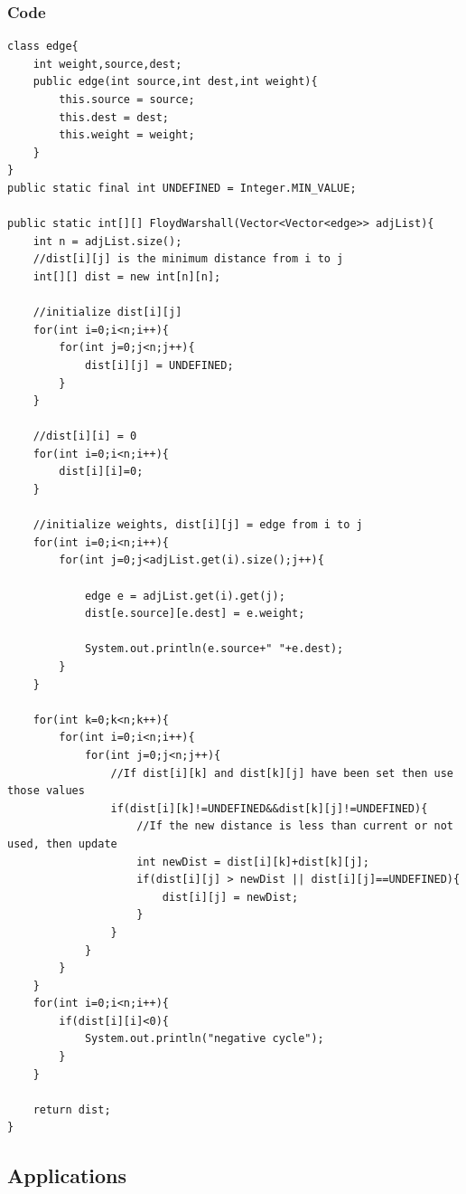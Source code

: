 \documentclass[11pt,oneside]{book}
\begin{document}
\subsubsection{Code}

\begin{lstlisting}
class edge{
    int weight,source,dest;
    public edge(int source,int dest,int weight){
        this.source = source;
        this.dest = dest;
        this.weight = weight;
    }
}
public static final int UNDEFINED = Integer.MIN_VALUE;
    
public static int[][] FloydWarshall(Vector<Vector<edge>> adjList){
    int n = adjList.size();
    //dist[i][j] is the minimum distance from i to j
    int[][] dist = new int[n][n];
    
    //initialize dist[i][j]
    for(int i=0;i<n;i++){
        for(int j=0;j<n;j++){
            dist[i][j] = UNDEFINED;
        }
    }
    
    //dist[i][i] = 0
    for(int i=0;i<n;i++){
        dist[i][i]=0;
    }
    
    //initialize weights, dist[i][j] = edge from i to j
    for(int i=0;i<n;i++){
        for(int j=0;j<adjList.get(i).size();j++){
            
            edge e = adjList.get(i).get(j);
            dist[e.source][e.dest] = e.weight;
            
            System.out.println(e.source+" "+e.dest);
        }
    }
    
    for(int k=0;k<n;k++){
        for(int i=0;i<n;i++){
            for(int j=0;j<n;j++){
                //If dist[i][k] and dist[k][j] have been set then use those values
                if(dist[i][k]!=UNDEFINED&&dist[k][j]!=UNDEFINED){
                    //If the new distance is less than current or not used, then update
                    int newDist = dist[i][k]+dist[k][j];
                    if(dist[i][j] > newDist || dist[i][j]==UNDEFINED){
                        dist[i][j] = newDist;
                    }
                }
            }
        }
    }
    for(int i=0;i<n;i++){
        if(dist[i][i]<0){
            System.out.println("negative cycle");
        }
    }
    
    return dist;
}
\end{lstlisting}

\subsection{Applications}
\end{document}
